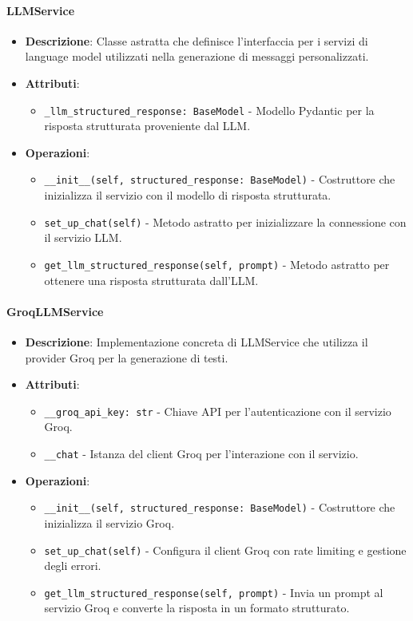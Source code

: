 \documentclass[10pt]{article}
\begin{document}
    \paragraph{LLMService}
    \begin{itemize}
        \item \textbf{Descrizione}: Classe astratta che definisce l'interfaccia per i servizi di language model utilizzati nella generazione di messaggi personalizzati.
        \item \textbf{Attributi}:
        \begin{itemize}
            \item \texttt{\_llm\_structured\_response: BaseModel} - Modello Pydantic per la risposta strutturata proveniente dal LLM.
        \end{itemize}
        \item \textbf{Operazioni}:
        \begin{itemize}
            \item \texttt{\_\_init\_\_(self, structured\_response: BaseModel)} - Costruttore che inizializza il servizio con il modello di risposta strutturata.
            \item \texttt{set\_up\_chat(self)} - Metodo astratto per inizializzare la connessione con il servizio LLM.
            \item \texttt{get\_llm\_structured\_response(self, prompt)} - Metodo astratto per ottenere una risposta strutturata dall'LLM.
        \end{itemize}
    \end{itemize}

    \paragraph{GroqLLMService}
    \begin{itemize}
        \item \textbf{Descrizione}: Implementazione concreta di LLMService che utilizza il provider Groq per la generazione di testi.
        \item \textbf{Attributi}:
        \begin{itemize}
            \item \texttt{\_\_groq\_api\_key: str} - Chiave API per l'autenticazione con il servizio Groq.
            \item \texttt{\_\_chat} - Istanza del client Groq per l'interazione con il servizio.
        \end{itemize}
        \item \textbf{Operazioni}:
        \begin{itemize}
            \item \texttt{\_\_init\_\_(self, structured\_response: BaseModel)} - Costruttore che inizializza il servizio Groq.
            \item \texttt{set\_up\_chat(self)} - Configura il client Groq con rate limiting e gestione degli errori.
            \item \texttt{get\_llm\_structured\_response(self, prompt)} - Invia un prompt al servizio Groq e converte la risposta in un formato strutturato.
        \end{itemize}
    \end{itemize}
\end{document}
